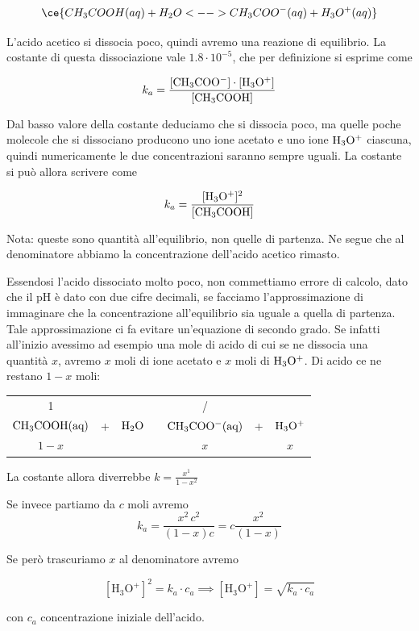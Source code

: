 $$\ce{CH_3COOH(aq) + H_2O <--> CH_3COO^-(aq) + H_3O^+(aq)}$$

L'acido acetico si dissocia poco, quindi avremo una reazione di equilibrio. La costante di questa dissociazione vale $1.8 \cdot 10^{-5}$, che per definizione si esprime come

$$k_a=\frac{\rm{[CH_3COO^-]} \cdot \rm{[H_3O^+]}}{\rm{[CH_3COOH]}}$$

Dal basso valore della costante deduciamo che si dissocia poco, ma quelle poche molecole che si dissociano producono uno ione acetato e uno ione $\rm H_3O^+$ ciascuna, quindi numericamente le due concentrazioni saranno sempre uguali. La costante si può allora scrivere come

$$k_a=\frac{\rm{[H_3O^+]^2}}{\rm{[CH_3COOH]}}$$

Nota: queste sono quantità all'equilibrio, non quelle di partenza. Ne segue che al denominatore abbiamo la concentrazione dell'acido acetico rimasto.

Essendosi l'acido dissociato molto poco, non commettiamo errore di calcolo, dato che il pH è dato con due cifre decimali, se facciamo l'approssimazione di immaginare che la concentrazione all'equilibrio sia uguale a quella di partenza. Tale approssimazione ci fa evitare un'equazione di secondo grado. Se infatti all'inizio avessimo ad esempio una mole di acido di cui se ne dissocia una quantità $x$, avremo $x$ moli di ione acetato e $x$ moli di $\rm H_3O^+$. Di acido ce ne restano $1-x$ moli:

\begin{center}
    \begin{tabular}{ccccccc}
        1 &  &  & & / & &\\
        $\rm CH_3COOH(aq)$ & + & $\rm H_2O$ & \ce{<-->} & $\rm CH_3COO^-(aq)$ & + & $\rm H_3O^+$\\
        $1-x$ & & & & $x$ & & $x$\\
    \end{tabular}
\end{center}

La costante allora diverrebbe $k=\frac{x^1}{1-x^2}$

Se invece partiamo da $c$ moli avremo
$$k_a = \frac{x^2 \, c^2}{(1-x)c}= c \frac{x^2}{(1-x)}$$

Se però trascuriamo $x$ al denominatore avremo

$$[\text{H}_3\text{O}^+]^2= k_a \cdot c_a \implies [\text{H}_3\text{O}^+] = \sqrt{k_a \cdot c_a}$$

con $c_a$ concentrazione iniziale dell'acido.

